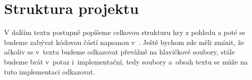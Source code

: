 
\section{Struktura projektu}

V dalším textu postupně popíšeme celkovou strukturu hry z pohledu \UEu{} a poté se budeme zabývat kódovou částí napsanou v~\CPP{}. Ještě bychom zde měli zmínit, že ačkoliv se v~textu budeme odkazovat převážně na hlavičkové soubory, stále budeme brát v~potaz i~implementační, tedy  soubory a~obsah textu se může na tuto implementaci odkazovat.


